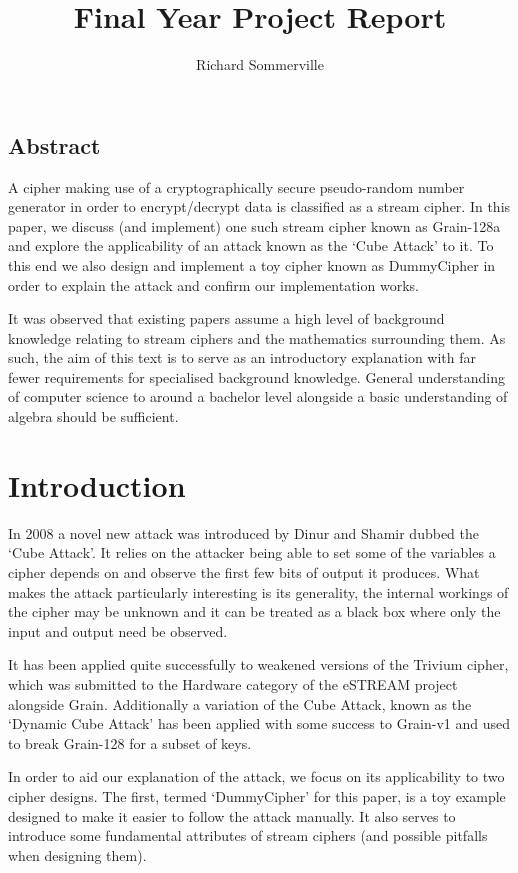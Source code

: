 \documentclass{report}
\title{Final Year Project Report}
\author{Richard Sommerville}
\date{}
\let\Oldsection\section
\renewcommand{\section}{\FloatBarrier\Oldsection}
\begin{document}
\section{Abstract}
A cipher making use of a cryptographically secure pseudo-random number generator in order to encrypt/decrypt data is classified as a stream cipher\cite{streamcipherDef}. In this paper, we discuss (and implement) one such stream cipher known as Grain-128a and explore the applicability of an attack known as the `Cube Attack' to it. To this end we also design and implement a toy cipher known as DummyCipher in order to explain the attack and confirm our implementation works.

It was observed that existing papers assume a high level of background knowledge relating to stream ciphers and the mathematics surrounding them\cite{DinurShamir2009}\cite{DynamicCube128}\cite{MobiusTransform}. As such, the aim of this text is to serve as an introductory explanation with far fewer requirements for specialised background knowledge. General understanding of computer science to around a bachelor level alongside a basic understanding of algebra should be sufficient.
\tableofcontents

\chapter{Introduction}
In 2008 a novel new attack was introduced by Dinur and Shamir\cite{DinurShamir2009} dubbed the `Cube Attack'. It relies on the attacker being able to set some of the variables a cipher depends on and observe the first few bits of output it produces. What makes the attack particularly interesting is its generality, the internal workings of the cipher may be unknown and it can be treated as a black box where only the input and output need be observed.

It has been applied quite successfully to weakened versions of the Trivium cipher\cite{DinurShamir2009}\cite{MobiusTransform}, which was submitted to the Hardware category of the eSTREAM project alongside Grain\cite{eStreamPort}. Additionally a variation of the Cube Attack, known as the `Dynamic Cube Attack' has been applied with some success to Grain-v1\cite{cryptoeprint:2010:570} and used to break Grain-128 for a subset of keys\cite{DynamicCube128}.

In order to aid our explanation of the attack, we focus on its applicability to two cipher designs. The first, termed `DummyCipher' for this paper, is a toy example designed to make it easier to follow the attack manually. It also serves to introduce some fundamental attributes of stream ciphers (and possible pitfalls when designing them).
\end{document}
